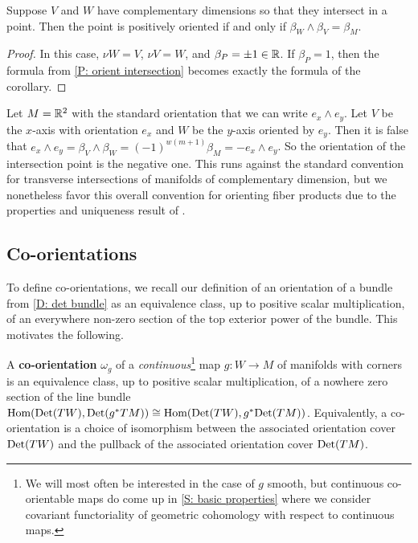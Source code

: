 \begin{corollary}\label{C: orient complementary intersection}
	Suppose $V$ and $W$ have complementary dimensions so that they intersect in a point.
	Then the point is positively oriented if and only if $\beta_{W} \wedge \beta_{V} = \beta_M$.
\end{corollary}

\begin{proof}
	In this case, $\nu W = V$, $\nu V = W$, and $\beta_P = \pm 1 \in \mathbb{R}$.
	If $\beta_P = 1$, then the formula from \cref{P: orient intersection} becomes exactly the formula of the corollary.
\end{proof}

\begin{example}
	Let $M = \mathbb{R}^2$ with the standard orientation that we can write $e_x \wedge e_y$.
	Let $V$ be the $x$-axis with orientation $e_x$ and $W$ be the $y$-axis oriented by $e_y$.
	Then it is false that $e_x \wedge e_y = \beta_{V} \wedge \beta_{W} = (-1)^{w(m+1)} \beta_M = -e_x \wedge e_y$.
	So the orientation of the intersection point is the negative one.
	This runs against the standard convention for transverse intersections of manifolds of complementary dimension, but we nonetheless favor this overall convention for orienting fiber products due to the properties and uniqueness result of \cite{RamBas09}.
\end{example}

\subsection{Co-orientations}\label{S: co-orientations}

To define co-orientations, we recall our definition of an orientation of a bundle from \cref{D: det bundle} as an equivalence class, up to positive scalar multiplication, of an everywhere non-zero section of the top exterior power of the bundle.
This motivates the following.

\begin{definition}\label{D: co-orientations}
	A \textbf{co-orientation} $\omega_g$ of a \textit{continuous}\footnote{We will most often be interested in the case of $g$ smooth, but continuous co-orientable maps do come up in \cref{S: basic properties} where we consider covariant functoriality of geometric cohomology with respect to continuous maps.} map $g \colon W \to M$ of manifolds with corners is an equivalence class, up to positive scalar multiplication, of a nowhere zero section of the line bundle $\textup{Hom}({\rm Det}(TW), {\rm Det}(g^*TM)) \cong \textup{Hom}({\rm Det}(TW), g^*{\rm Det}(TM))$.
	Equivalently, a co-orientation is a choice of isomorphism between the associated orientation cover ${\rm Det}(TW)$ and the pullback of the associated orientation cover ${\rm Det}(TM)$.
\end{definition}

